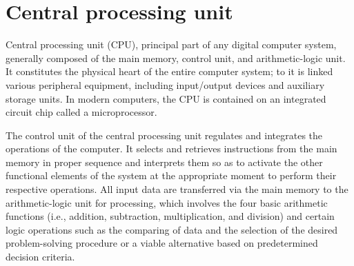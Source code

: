 \documentclass[11pt,a4paper,twoside]{article}
\begin{document}
\section{Central processing unit}
Central processing unit (CPU), principal part of any digital computer system, generally composed of the main memory, control unit, and arithmetic-logic unit. It constitutes the physical heart of the entire computer system; to it is linked various peripheral equipment, including input/output devices and auxiliary storage units. In modern computers, the CPU is contained on an integrated circuit chip called a microprocessor.\par
The control unit of the central processing unit regulates and integrates the operations of the computer. It selects and retrieves instructions from the main memory in proper sequence and interprets them so as to activate the other functional elements of the system at the appropriate moment to perform their respective operations. All input data are transferred via the main memory to the arithmetic-logic unit for processing, which involves the four basic arithmetic functions (i.e., addition, subtraction, multiplication, and division) and certain logic operations such as the comparing of data and the selection of the desired problem-solving procedure or a viable alternative based on predetermined decision criteria.
\end{document}
